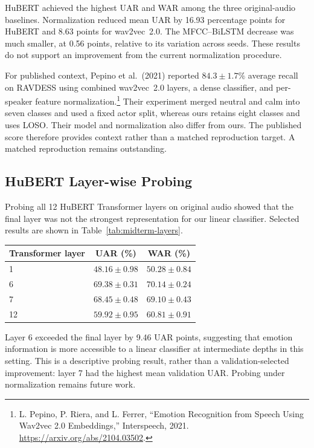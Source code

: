 HuBERT achieved the highest UAR and WAR among the three original-audio baselines. Normalization reduced mean UAR by 16.93 percentage points for HuBERT and 8.63 points for wav2vec~2.0. The MFCC--BiLSTM decrease was much smaller, at 0.56 points, relative to its variation across seeds. These results do not support an improvement from the current normalization procedure.

For published context, Pepino et al.\ (2021) reported $84.3 \pm 1.7\%$ average recall on RAVDESS using combined wav2vec~2.0 layers, a dense classifier, and per-speaker feature normalization.\footnote{L. Pepino, P. Riera, and L. Ferrer, ``Emotion Recognition from Speech Using Wav2vec 2.0 Embeddings,'' Interspeech, 2021. \url{https://arxiv.org/abs/2104.03502}.} Their experiment merged neutral and calm into seven classes and used a fixed actor split, whereas ours retains eight classes and uses LOSO. Their model and normalization also differ from ours. The published score therefore provides context rather than a matched reproduction target. A matched reproduction remains outstanding.

\subsection{HuBERT Layer-wise Probing}

Probing all 12 HuBERT Transformer layers on original audio showed that the final layer was not the strongest representation for our linear classifier. Selected results are shown in Table~\ref{tab:midterm-layers}.

\begin{center}
\begin{tabular}{lcc}
\toprule
\textbf{Transformer layer} & \textbf{UAR (\%)} & \textbf{WAR (\%)} \\
\midrule
1 & $48.16 \pm 0.98$ & $50.28 \pm 0.84$ \\
6 & $69.38 \pm 0.31$ & $70.14 \pm 0.24$ \\
7 & $68.45 \pm 0.48$ & $69.10 \pm 0.43$ \\
12 & $59.92 \pm 0.95$ & $60.81 \pm 0.91$ \\
\bottomrule
\end{tabular}
\label{tab:midterm-layers}
\end{center}

Layer 6 exceeded the final layer by 9.46 UAR points, suggesting that emotion information is more accessible to a linear classifier at intermediate depths in this setting. This is a descriptive probing result, rather than a validation-selected improvement: layer 7 had the highest mean validation UAR. Probing under normalization remains future work.

